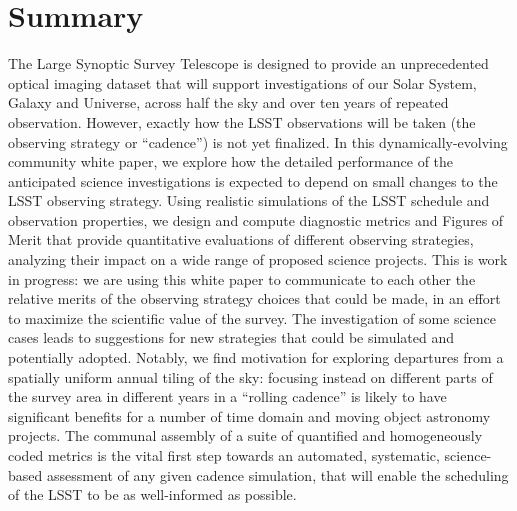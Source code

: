 \setcounter{chapter}{0}
\chapter*{Summary}
\def\chpname{summary}\label{chp:\chpname}
\markboth{}{}


\noindent
The Large Synoptic Survey Telescope is designed to provide an 
unprecedented optical imaging dataset that will support investigations 
of our Solar System, Galaxy and Universe, across half the sky and over ten
years of repeated observation.
%
However, exactly how the LSST observations will be taken (the observing strategy or ``cadence'') is not yet finalized.
%
In this dynamically-evolving community white paper, we explore how the
detailed performance of the anticipated science investigations is
expected to depend on small changes to the LSST observing strategy.
%
Using realistic simulations of the LSST schedule and observation
properties, we design and compute diagnostic metrics and Figures of
Merit that provide quantitative evaluations of different observing
strategies, analyzing their impact on a wide range of proposed science
projects.
%
This is work in progress: we are using this white paper to communicate
to each other the relative merits of the observing strategy choices that
could be made, in an effort to maximize the scientific value of the
survey.
%
The investigation of some science cases leads to suggestions for new
strategies that could be simulated and potentially adopted.
%
Notably, we find motivation for exploring departures from a spatially
uniform annual tiling of the sky: focusing instead on different parts of
the survey area in different years in a ``rolling cadence'' is likely to
have significant benefits for a number of time domain and moving object
astronomy projects.
%
The communal assembly of a suite of quantified and homogeneously coded
metrics is the vital first step towards an automated, systematic,
science-based assessment of any given cadence simulation, that will
enable the scheduling of the LSST to be as well-informed as possible.

\clearpage
